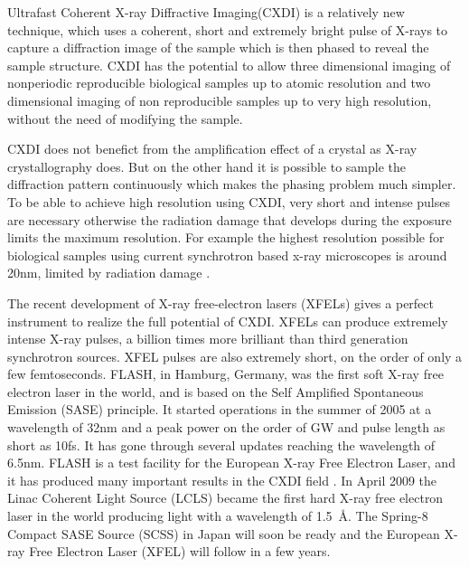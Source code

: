 
Ultrafast Coherent X-ray Diffractive Imaging(CXDI) is a relatively new
technique, which uses a coherent, short and extremely
bright pulse of X-rays to capture a diffraction image of the sample which is
then phased to reveal the sample structure. CXDI has the potential to allow three
dimensional imaging of nonperiodic reproducible biological samples up to atomic
resolution and two dimensional imaging of non reproducible samples up to
very high resolution, without the need of modifying the sample.

CXDI does not benefict from the
amplification effect of a crystal as X-ray crystallography does. But on the
other hand it is possible to sample the diffraction pattern continuously which
makes the phasing problem much simpler. To be able to achieve high 
resolution using CXDI, very short and intense pulses are necessary otherwise the radiation
damage that develops during the exposure limits the maximum resolution. For
example the highest resolution possible for biological samples using current
synchrotron based x-ray microscopes is around 20nm, limited by radiation
damage \cite{Howells2009Assessment}.

The recent development of X-ray free-electron lasers (XFELs) gives a perfect
instrument to realize the full potential of CXDI. XFELs can produce extremely
intense X-ray pulses, a billion times more brilliant than third
generation synchrotron sources. XFEL pulses are also extremely short, on the order of
only a few femtoseconds. FLASH, in Hamburg, Germany, was the first soft X-ray
free electron laser in the world, and is based on the Self Amplified Spontaneous
Emission (SASE) principle. It started operations in the summer of 2005 at
a wavelength of 32nm and a peak power on the order of GW and pulse length as
short as 10fs. It has gone through several updates reaching the wavelength of
6.5nm. FLASH is a test facility for the European X-ray Free Electron
Laser, and it has produced many important results in the CXDI field \cite{Chapman2006Femtosecond,Chapman2007Femtosecond}. In April 2009 the Linac Coherent Light Source (LCLS)
became the first hard X-ray free electron laser in the world producing light
with a wavelength of \mbox{1.5 \AA}. The Spring-8 Compact SASE Source (SCSS) in
Japan will soon be ready and the European X-ray Free Electron Laser (XFEL)
will follow in a few years.

